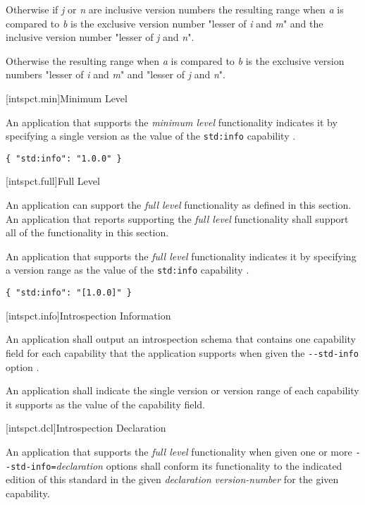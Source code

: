 \pnum
Otherwise if \emph{j} or \emph{n} are inclusive version numbers the resulting
range when \emph{a} is compared to \emph{b} is the exclusive version number
"lesser of \emph{i} and \emph{m}" and the inclusive version number "lesser of
\emph{j} and \emph{n}".

\pnum
Otherwise the resulting range when \emph{a} is compared to \emph{b} is the
exclusive version numbers "lesser of \emph{i} and \emph{m}" and "lesser of
\emph{j} and \emph{n}".

[intspct.min]{Minimum Level}

\pnum
An application that supports the \emph{minimum level} functionality indicates
it by specifying a single version  as the value of the
\verb|std:info| capability .

\begin{example}
\verb|{ "std:info": "1.0.0" }|
\end{example}

[intspct.full]{Full Level}

\pnum
An application can support the \emph{full level} functionality as defined in
this section. An application that reports supporting the \emph{full level}
functionality shall support all of the functionality in this section.

\pnum
An application that supports the \emph{full level} functionality indicates it by
specifying a version range  as the value of the
\verb|std:info| capability  .

\begin{example}
\verb|{ "std:info": "[1.0.0]" }|
\end{example}
	
[intspct.info]{Introspection Information}

\pnum
An application shall output an introspection schema  that
contains one capability field for each capability that the application supports
when given the \verb|--std-info| option .

\pnum
An application shall indicate the single version  or
version range  of each capability it supports as the
value of the capability field.

[intspct.dcl]{Introspection Declaration}

\pnum
An application that supports the \emph{full level} functionality when given one
or more \verb|--std-info=|\emph{declaration} options shall conform its
functionality to the indicated edition of this standard in the given
\emph{declaration} \emph{version-number} for the given capability.

